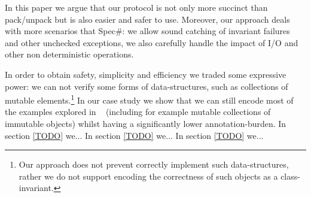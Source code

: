 In this paper we argue that our protocol is not only more succinct than pack/unpack but is also easier and safer to use.
Moreover, our approach deals 
with more 
scenarios that Spec\#:
we allow sound catching of invariant failures and other unchecked exceptions, we also carefully handle
the impact of I/O and other non deterministic operations.



In order to obtain safety, simplicity and efficiency we traded some expressive power:
we can not verify some forms of data-structures, such as collections of mutable elements.\footnote{Our approach does not prevent correctly implement such data-structures, rather we do not support encoding the correctness of such objects as a class-invariant.}
In our case study we show that
we can still encode most of the examples explored in ~\cite{???} (including for example mutable collections of immutable objects) whilst having a significantly lower annotation-burden.
In section \ref{TODO} we...
In section \ref{TODO} we...
In section \ref{TODO} we...

